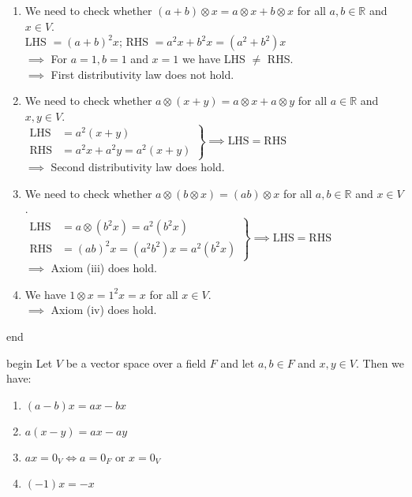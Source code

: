 \documentclass[
  12pt,
  a4paper,
  twoside]{article}
\providecommand{\tightlist}{%
  \setlength{\itemsep}{0pt}\setlength{\parskip}{0pt}}
\theoremstyle{plain}
\theoremstyle{definition}
\begin{document}
\begin{enumerate}
\def\labelenumi{(\roman{enumi})}
\item
  We need to check whether \((a+b) \otimes x = a \otimes x + b \otimes x\) for all \(a,b \in \mathbb{R}\) and \(x \in V\).\\
  LHS \(= (a+b)^{2} x\); RHS \(= a^{2}x + b^{2}x = (a^{2} + b^{2})x\)\\
  \(\implies\) For \(a=1, b=1\) and \(x=1\) we have LHS \(\neq\) RHS.\\
  \(\implies\) First distributivity law does not hold.
\item
  We need to check whether \(a \otimes (x + y) = a \otimes x + a \otimes y\) for all \(a \in \mathbb{R}\) and \(x,y \in V\).\\
  \(\left. \begin{aligned} \text{LHS} & = a^{2}(x+y) \\ \text{RHS} & = a^{2}x + a^{2}y = a^{2}(x+y) \end{aligned} \right\} \implies \text{LHS} = \text{RHS}\)\\
  \(\implies\) Second distributivity law does hold.
\item
  We need to check whether \(a \otimes (b \otimes x) = (ab) \otimes x\) for all \(a,b \in \mathbb{R}\) and \(x \in V\).\\
  \(\left. \begin{aligned} \text{LHS} & = a \otimes (b^{2}x) = a^{2} (b^{2}x) \\ \text{RHS} & = (ab)^{2}x = (a^{2}b^{2})x = a^{2} (b^{2}x) \end{aligned} \right\} \implies \text{LHS} = \text{RHS}\)\\
  \(\implies\) Axiom (iii) does hold.
\item
  We have \(1 \otimes x = 1^{2} x = x\) for all \(x \in V\).\\
  \(\implies\) Axiom (iv) does hold.
\end{enumerate}

\csname end

\csname begin\label{cnj:prop-vsbasics}
Let \(V\) be a vector space over a field \(F\) and let \(a,b \in F\) and \(x,y \in V\). Then we have:

\begin{enumerate}
\def\labelenumi{(\alph{enumi})}
\tightlist
\item
  \((a-b)x = ax - bx\)
\item
  \(a(x-y) = ax - ay\)
\item
  \(ax = 0_{V} \iff a = 0_{F}\) or \(x=0_{V}\)
\item
  \((-1)x = -x\)
\end{enumerate}
\end{document}
